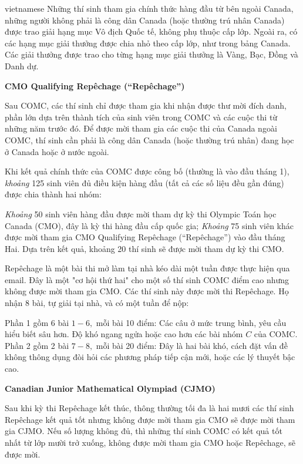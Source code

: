 \documentclass{article}
\begin{document}
\begin{otherlanguage*}{vietnamese}
Những thí sinh tham gia chính thức hàng đầu từ bên ngoài Canada, những người không phải là công dân Canada (hoặc thường trú nhân Canada)
được trao giải hạng mục Vô địch Quốc tế, không phụ thuộc cấp lớp.
Ngoài ra, có các hạng mục giải thưởng được chia nhỏ theo cấp lớp, như trong bảng Canada.
Các giải thưởng được trao cho từng hạng mục giải thưởng là Vàng, Bạc, Đồng và Danh dự.

\newpage
\textbf{CMO Qualifying Repêchage (“Repêchage”)}

Sau COMC, các thí sinh chỉ được tham gia khi nhận được thư mời đích danh, phần lớn dựa trên thành tích của sinh viên trong COMC và các cuộc thi từ những năm trước đó.
Để được mời tham gia các cuộc thi của Canada ngoài COMC, thí sinh cần phải là công dân Canada (hoặc thường trú nhân) đang học ở Canada hoặc ở nước ngoài.

Khi kết quả chính thức của COMC được công bố (thường là vào đầu tháng 1), \textit{khoảng} 125 sinh viên đủ điều kiện hàng đầu (tất cả các số liệu đều gần đúng) được chia thành hai nhóm:
\begin{itemize}[topsep=0pt, partopsep=0pt, itemsep=0pt]
    \ii \textit{Khoảng} 50 sinh viên hàng đầu được mời tham dự kỳ thi Olympic Toán học Canada (CMO), đây là kỳ thi hàng đầu cấp quốc gia;
    \ii \textit{Khoảng} 75 sinh viên khác được mời tham gia CMO Qualifying Repêchage (“Repêchage”) vào đầu tháng Hai. Dựa trên kết quả, khoảng 20 thí sinh sẽ được mời tham dự kỳ thi CMO.
\end{itemize}

Repêchage là một bài thi mở làm tại nhà kéo dài một tuần được thực hiện qua email. Đây là một "cơ hội thứ hai" cho một số thí sinh COMC điểm cao nhưng không được mời tham gia CMO.
Các thí sinh này được mời thi Repêchage. Họ nhận 8 bài, tự giải tại nhà, và có một tuần để nộp:
\begin{itemize}[topsep=0pt, partopsep=0pt, itemsep=0pt]
    \ii Phần 1 gồm 6 bài $1-6,$ mỗi bài 10 điểm: Các câu ở mức trung bình, yêu cầu hiểu biết sâu hơn. Độ khó ngang ngửa hoặc cao hơn các bài nhóm $C$ của COMC.
    \ii Phần 2 gồm 2 bài $7-8,$ mỗi bài 20 điểm: Đây là hai bài khó, cách đặt vấn đề không thông dụng đòi hỏi các phương pháp tiếp cận mới, hoặc các lý thuyết bậc cao.
\end{itemize}

\bigbreak
\textbf{Canadian Junior Mathematical Olympiad (CJMO)}

Sau khi kỳ thi Repêchage kết thúc, thông thường tối đa là hai mươi các thí sinh Repêchage kết quả tốt nhưng không được mời tham gia CMO sẽ được mời tham gia CJMO.
Nếu số lượng không đủ, thì những thí sinh COMC có kết quả tốt nhất từ lớp mười trở xuống, không được mời tham gia CMO hoặc Repêchage, sẽ được mời.


\end{otherlanguage*}
\end{document}
